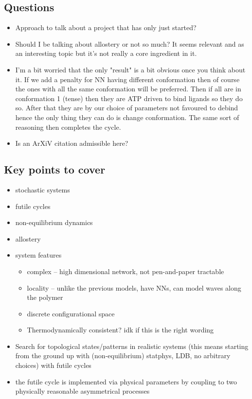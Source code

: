 \documentclass[11pt]{article}
\begin{document}
\subsection{Questions}
\begin{itemize}
	\item Approach to talk about a project that has only just started?
	\item Should I be talking about allostery or not so much? It seems relevant and as an interesting topic but it's not really a core ingredient in it.
	\item I'm a bit worried that the only "result" is a bit obvious once you think about it. If we add a penalty for NN having different conformation then of course the ones with all the same conformation will be preferred. Then if all are in conformation 1 (tense) then they are ATP driven to bind ligands so they do so. After that they are by our choice of parameters not favoured to debind hence the only thing they can do is change conformation. The same sort of reasoning then completes the cycle.
	\item Is an ArXiV citation admissible here?\cite{soneHermitianNonHermitianTopology2024}
\end{itemize}

\subsection{Key points to cover}
\begin{itemize}
	\item stochastic systems
	\item futile cycles
	\item non-equilibrium dynamics
	\item allostery
	\item system features
	      \begin{itemize}
		      \item complex -- high dimensional network, not pen-and-paper tractable
		      \item locality -- unlike the previous models, have NNs, can model waves along the polymer
		      \item discrete configurational space
		      \item Thermodynamically consistent? idk if this is the right wording
	      \end{itemize}
	\item Search for topological states/patterns in realistic systems (this means starting from the ground up with (non-equilibrium) statphys, LDB, no arbitrary choices) with futile cycles
	\item the futile cycle is implemented via physical parameters by coupling to two physically reasonable asymmetrical processes
\end{itemize}
\end{document}
